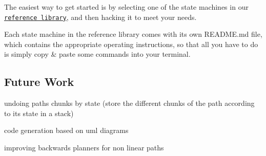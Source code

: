 The easiest way to get started is by selecting one of the state machines in our \href{https://github.com/reelrbtx/SMACC/tree/master/smacc_sm_reference_library}{\tt reference library}, and then hacking it to meet your needs.

Each state machine in the reference library comes with it\textquotesingle{}s own R\+E\+A\+D\+M\+E.\+md file, which contains the appropriate operating instructions, so that all you have to do is simply copy \& paste some commands into your terminal.

\subsection*{Future Work}


\begin{DoxyItemize}
\item undoing paths chunks by state (store the different chunks of the path according to its state in a stack)
\item code generation based on uml diagrams
\item improving backwards planners for non linear paths 
\end{DoxyItemize}